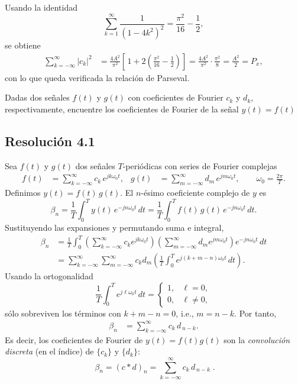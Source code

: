 \documentclass[
  11pt,
  letterpaper,
   addpoints,
   answers
  ]{exam}
\begin{document}
\begin{questions}
\begin{solution}
Usando la identidad
\begin{equation}
\sum_{k=1}^{\infty}\frac{1}{(1-4k^2)^2}
=\frac{\pi^2}{16}-\frac{1}{2},
\end{equation}
se obtiene
\begin{align}
\sum_{k=-\infty}^{\infty}|c_k|^2
&=\frac{4A^2}{\pi^2}\left[\,1+2\!\left(\frac{\pi^2}{16}-\frac{1}{2}\right)\right]
=\frac{4A^2}{\pi^2}\cdot\frac{\pi^2}{8}
=\frac{A^2}{2}
=P_x,
\end{align}
con lo que queda verificada la relación de Parseval.
\end{solution}
\question Dadas dos señales $f(t)$ y $g(t)$ con coeficientes de Fourier $c_k$ y $d_k$, respectivamente, encuentre los coeficientes de Fourier de la señal $y(t) = f(t)$
\begin{solution}
\subsection*{Resolución 4.1}
Sea \(f(t)\) y \(g(t)\) dos señales \(T\)-periódicas con series de Fourier complejas
\begin{align}
f(t) &= \sum_{k=-\infty}^{\infty} c_k\,e^{jk\omega_0 t}, &
g(t) &= \sum_{m=-\infty}^{\infty} d_m\,e^{jm\omega_0 t}, \qquad \omega_0=\frac{2\pi}{T}.
\end{align}
Definimos \(y(t)=f(t)\,g(t)\). El \(n\)-ésimo coeficiente complejo de \(y\) es
\begin{equation}
\beta_n=\frac{1}{T}\int_{0}^{T} y(t)\,e^{-jn\omega_0 t}\,dt
= \frac{1}{T}\int_{0}^{T} f(t)\,g(t)\,e^{-jn\omega_0 t}\,dt .
\end{equation}
Sustituyendo las expansiones y permutando suma e integral,
\begin{align}
\beta_n
&= \frac{1}{T}\int_{0}^{T} 
\left(\sum_{k=-\infty}^{\infty} c_k e^{jk\omega_0 t}\right)
\left(\sum_{m=-\infty}^{\infty} d_m e^{jm\omega_0 t}\right)
e^{-jn\omega_0 t}\,dt \\
&= \sum_{k=-\infty}^{\infty}\sum_{m=-\infty}^{\infty} 
c_k d_m \left(\frac{1}{T}\int_{0}^{T} e^{j(k+m-n)\omega_0 t}\,dt\right).
\end{align}
Usando la ortogonalidad
\begin{equation}
\frac{1}{T}\int_{0}^{T} e^{j\ell\omega_0 t}\,dt
=\begin{cases}
1, & \ell=0,\\
0, & \ell\neq 0,
\end{cases}
\end{equation}
sólo sobreviven los términos con \(k+m-n=0\), i.e., \(m=n-k\). Por tanto,
\begin{align}
\beta_n
&= \sum_{k=-\infty}^{\infty} c_k\, d_{\,n-k}.
\end{align}
Es decir, los coeficientes de Fourier de \(y(t)=f(t)g(t)\) son la \emph{convolución discreta} (en el índice) de \(\{c_k\}\) y \(\{d_k\}\):
\begin{equation}
\boxed{\;\beta_n=(c*d)_n=\displaystyle\sum_{k=-\infty}^{\infty} c_k\,d_{\,n-k}\;}.
\end{equation}


\end{solution}
\end{questions}
\end{document}
